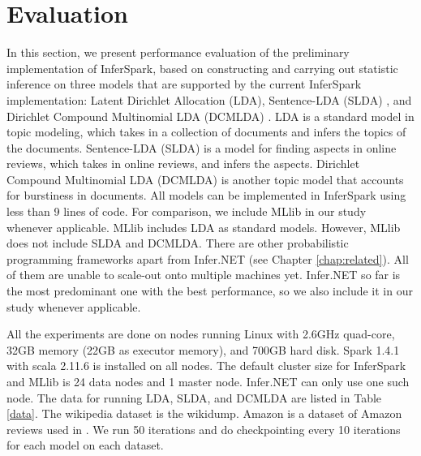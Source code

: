 \section{Evaluation}
\label{sec:eval}

In this section, we present performance evaluation of the preliminary
implementation of InferSpark, based on constructing and carrying out statistic
inference on three models that are supported by the current InferSpark
implementation: Latent Dirichlet Allocation (LDA), Sentence-LDA (SLDA)
, and Dirichlet Compound Multinomial LDA (DCMLDA)
.  LDA is a standard model in topic modeling, which takes
in a collection of documents and infers the topics of the documents.
Sentence-LDA (SLDA) is a model for finding aspects in online reviews, which
takes in online reviews, and infers the aspects.  Dirichlet Compound
Multinomial LDA (DCMLDA) is another topic model that accounts for burstiness
in documents.  All models can be implemented in InferSpark using less than 9
lines of code. 
For comparison, we include MLlib in our study whenever applicable.
MLlib includes LDA as standard models.  However, MLlib does not include SLDA and DCMLDA.
There are other probabilistic programming frameworks apart from Infer.NET (see
Chapter \ref{chap:related}).
All of them are unable to scale-out onto multiple machines yet.  
Infer.NET so far is the most predominant one with the best performance, so we also include it in our study whenever applicable.

All the experiments are done on nodes running Linux with 2.6GHz quad-core, 32GB memory (22GB as executor memory), and 700GB hard disk. 
Spark 1.4.1 with scala 2.11.6 is installed on all nodes.
The default cluster size for InferSpark and MLlib is 24 data nodes and 1 master node.
Infer.NET can only use one such node.
The data for running LDA, SLDA, and DCMLDA are listed in Table \ref{data}.
The wikipedia dataset is the wikidump. Amazon is a dataset of Amazon reviews
used in .
We run 50 iterations and do checkpointing every 10 iterations for each model on each dataset.

